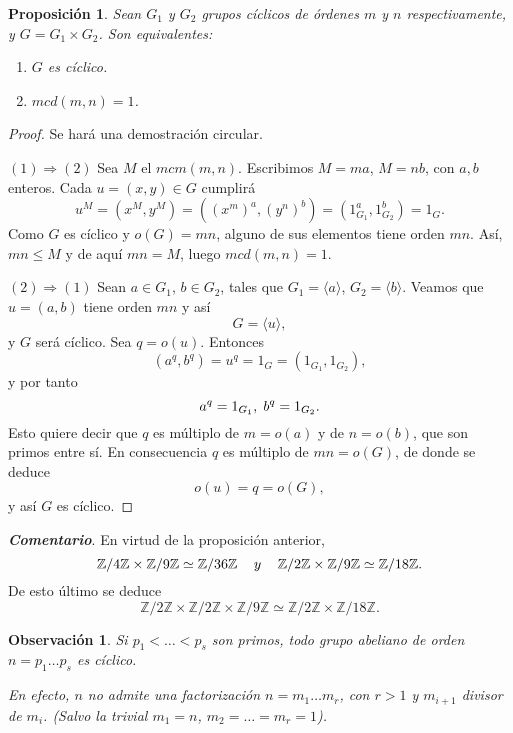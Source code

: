 \documentclass[12pt]{article}
\newtheorem{proposition}[theorem]{Proposición}
\newtheorem{observation}{Observación}[theorem]
\begin{document}
\begin{proposition} Sean $G_{1}$ y $G_{2}$ grupos cíclicos de órdenes $m$ y $n$ respectivamente, y $G = G_{1} \times G_{2}$. Son equivalentes:
\begin{enumerate}
\item $G$ es cíclico.
\item $mcd(m,n) = 1$.
\end{enumerate}
\end{proposition}
\begin{proof}
Se hará una demostración circular.

$(1) \Rightarrow (2)$ Sea $M$ el $mcm(m,n)$. Escribimos $M = ma$, $M = nb$, con $a,b$ enteros. Cada $u = (x,y) \in G$ cumplirá $$u^{M} = (x^{M}, y^{M}) = ((x^{m})^{a}, (y^{n})^{b}) = (1_{G_{1}}^{a}, 1_{G_{2}}^{b}) = 1_{G}.$$ Como $G$ es cíclico y $o(G) = mn$, alguno de sus elementos tiene orden $mn$. Así, $mn \leq M$ y de aquí $mn = M$, luego $mcd(m,n)=1$.

$(2)  \Rightarrow (1)$ Sean $a \in G_{1}$, $b \in G_{2}$, tales que $G_{1} = \langle a \rangle$, $G_{2} = \langle b \rangle$. Veamos que $u = (a,b)$ tiene orden $mn$ y así $$G = \langle u \rangle,$$ y $G$ será cíclico. Sea $q = o(u)$. Entonces $$(a^{q}, b^{q}) = u^{q} = 1_{G} = (1_{G_{1}}, 1_{G_{2}}),$$ y por tanto $$a^{q} = 1_{G_{1}}, \hspace{0.1cm} b^{q} = 1_{G_{2}}.$$ Esto quiere decir que $q$ es múltiplo de $m = o(a)$ y de $n = o(b)$, que son primos entre sí. En consecuencia $q$ es múltiplo de $mn = o(G)$, de donde se deduce $$o(u) = q = o(G),$$ y así $G$ es cíclico. 

\end{proof}

\textbf{\textit{Comentario}}. En virtud de la proposición anterior, $$\mathbb{Z}/4\mathbb{Z} \times \mathbb{Z}/9\mathbb{Z} \simeq \mathbb{Z}/36\mathbb{Z}\hspace{0.3cm}~y~\hspace{0.3cm} \mathbb{Z}/2\mathbb{Z} \times \mathbb{Z}/9\mathbb{Z} \simeq \mathbb{Z}/18\mathbb{Z}.$$
De esto último se deduce $$\mathbb{Z}/2\mathbb{Z} \times \mathbb{Z}/2\mathbb{Z} \times \mathbb{Z}/9\mathbb{Z} \simeq \mathbb{Z}/2\mathbb{Z} \times \mathbb{Z}/18\mathbb{Z}.$$

\begin{observation}Si $p_1 < \ldots < p_s$ son primos, todo grupo abeliano de orden $n=p_1 \ldots p_s$ es cíclico.

En efecto, $n$ no admite una factorización $n=m_1 \ldots m_r$, con $r>1$ y $m_{i+1}$ divisor de $m_i$. (Salvo la trivial $m_1 = n$, $m_2 = \ldots = m_r = 1$).
\end{observation}
\end{document}

